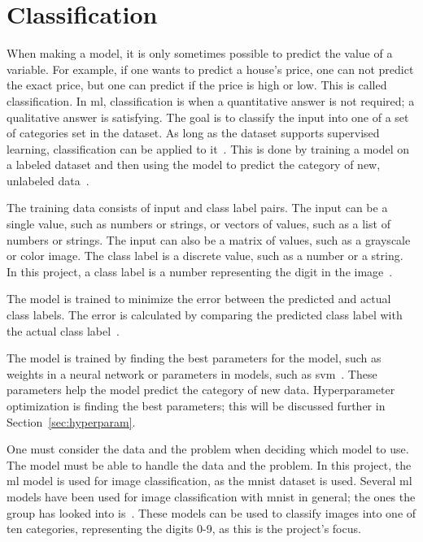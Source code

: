 \section{Classification}\label{sec:classification}
When making a model, it is only sometimes possible to predict the value of a variable. For example, if one wants to predict a house's price, one can not predict the exact price, but one can predict if the price is high or low. This is called classification. In \gls{ml}, classification is when a quantitative answer is not required; a qualitative answer is satisfying. The goal is to classify the input into one of a set of categories set in the dataset. As long as the dataset supports supervised learning, classification can be applied to it~\cite{james-statistical-learning1}. 
This is done by training a model on a labeled dataset and then using the model to predict the category of new, unlabeled data~\cite{james-statistical-learning1}. 

The training data consists of input and class label pairs. The input can be a single value, such as numbers or strings, or vectors of values, such as a list of numbers or strings. The input can also be a matrix of values, such as a grayscale or color image. The class label is a discrete value, such as a number or a string. In this project, a class label is a number representing the digit in the image~\cite{james-statistical-learning1}. 

The model is trained to minimize the error between the predicted and actual class labels. The error is calculated by comparing the predicted class label with the actual class label~\cite{james-statistical-learning1}. 

The model is trained by finding the best parameters for the model, such as weights in a neural network or parameters in models, such as \gls{svm}~\cite{james-statistical-learning1}. These parameters help the model predict the category of new data. Hyperparameter optimization is finding the best parameters; this will be discussed further in Section~\ref{sec:hyperparam}.

One must consider the data and the problem when deciding which model to use. The model must be able to handle the data and the problem. In this project, the \gls{ml} model is used for image classification, as the \gls{mnist} dataset is used. Several \gls{ml} models have been used for image classification with \gls{mnist} in general; the ones the group has looked into is~\cite{lecun-mnist-database,IBM-computer-vision,convolutional-neural-networks-convnets,multi-column-neural-network-ciregan}. These models can be used to classify images into one of ten categories, representing the digits 0-9, as this is the project's focus. 

